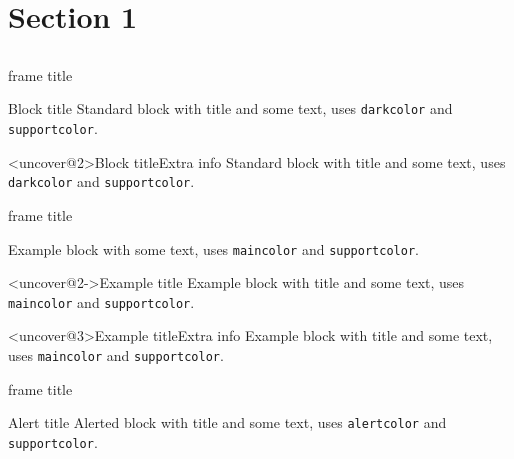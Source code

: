\section{Section 1}
\subsection{} %

\begin{frame}{frame title}
    \begin{block}{Block title}
        Standard block with title and some text, uses \texttt{darkcolor} and \texttt{supportcolor}.
    \end{block}
    \begin{block}<uncover@2>{Block title}{Extra info}
        Standard block with title and some text, uses \texttt{darkcolor} and \texttt{supportcolor}.
    \end{block}
\end{frame}

\begin{frame}{frame title}
    \begin{example}
        Example block with some text, uses \texttt{maincolor} and \texttt{supportcolor}.
    \end{example}
    \begin{exampleblock}<uncover@2->{Example title}
        Example block with title and some text, uses \texttt{maincolor} and \texttt{supportcolor}.
    \end{exampleblock}
    \begin{nameexblock}<uncover@3>{Example title}{Extra info}
        Example block with title and some text, uses \texttt{maincolor} and \texttt{supportcolor}.
    \end{nameexblock}
\end{frame}

\begin{frame}{frame title}
    \begin{alertblock}{Alert title}
        Alerted block with title and some text, uses \texttt{alertcolor} and \texttt{supportcolor}.
    \end{alertblock}
\end{frame}


